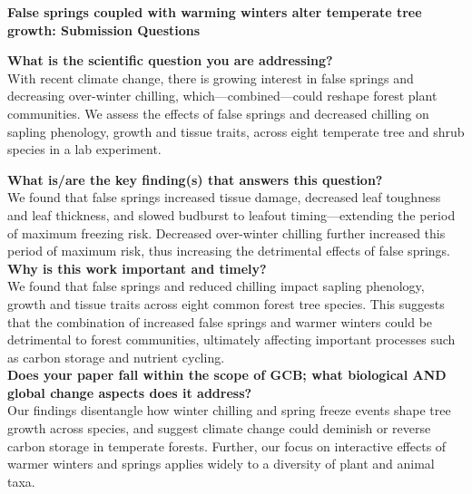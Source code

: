 \documentclass{article}\usepackage[]{graphicx}\usepackage[]{color}
\begin{document}
\nobibliography*
\noindent \textbf{\Large{False springs coupled with warming winters alter temperate tree growth: Submission Questions}}\\
\vspace{3ex}

\noindent \textbf{What is the scientific question you are addressing?} \\

\noindent With recent climate change, there is growing interest in false springs and decreasing over-winter chilling, which---combined---could reshape forest plant communities. We assess the effects of false springs and decreased chilling on sapling phenology, growth and tissue traits, across eight temperate tree and shrub species in a lab experiment.  \\ %
\noindent 


\noindent \textbf{What is/are the key finding(s) that answers this question?} \\

\noindent We found that false springs increased tissue damage, decreased leaf toughness and leaf thickness, and slowed budburst to leafout timing---extending the period of maximum freezing risk. Decreased over-winter chilling further increased this period of maximum risk, thus increasing the detrimental effects of false springs. \\ %

\noindent \textbf{Why is this work important and timely?}\\

\noindent We found that false springs and reduced chilling impact sapling phenology, growth and tissue traits across eight common forest tree species. This suggests that the combination of increased false springs and warmer winters could be detrimental to forest communities, ultimately affecting important processes such as carbon storage and nutrient cycling. \\ %

\noindent \textbf{ Does your paper fall within the scope of GCB; what biological AND global change aspects does it address?}\\

\noindent Our findings disentangle how winter chilling and spring freeze events shape tree growth across species, and suggest climate change could deminish or reverse carbon storage in temperate forests. Further, our focus on interactive effects of warmer winters and springs applies widely to a diversity of plant and animal taxa. \\ %
\end{document}
